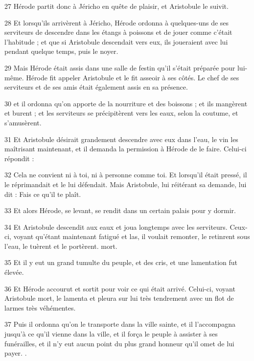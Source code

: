 \par 27 Hérode partit donc à Jéricho en quête de plaisir, et Aristobule le suivit.

\par 28 Et lorsqu'ils arrivèrent à Jéricho, Hérode ordonna à quelques-uns de ses serviteurs de descendre dans les étangs à poissons et de jouer comme c'était l'habitude ; et que si Aristobule descendait vers eux, ils joueraient avec lui pendant quelque temps, puis le noyer.

\par 29 Mais Hérode était assis dans une salle de festin qu'il s'était préparée pour lui-même. Hérode fit appeler Aristobule et le fit asseoir à ses côtés. Le chef de ses serviteurs et de ses amis était également assis en sa présence.

\par 30 et il ordonna qu'on apporte de la nourriture et des boissons ; et ils mangèrent et burent ; et les serviteurs se précipitèrent vers les eaux, selon la coutume, et s'amusèrent.

\par 31 Et Aristobule désirait grandement descendre avec eux dans l'eau, le vin les maîtrisant maintenant, et il demanda la permission à Hérode de le faire. Celui-ci répondit :

\par 32 Cela ne convient ni à toi, ni à personne comme toi. Et lorsqu'il était pressé, il le réprimandait et le lui défendait. Mais Aristobule, lui réitérant sa demande, lui dit : Fais ce qu'il te plaît.

\par 33 Et alors Hérode, se levant, se rendit dans un certain palais pour y dormir.

\par 34 Et Aristobule descendit aux eaux et joua longtemps avec les serviteurs. Ceux-ci, voyant qu'étant maintenant fatigué et las, il voulait remonter, le retinrent sous l'eau, le tuèrent et le portèrent. mort.

\par 35 Et il y eut un grand tumulte du peuple, et des cris, et une lamentation fut élevée.

\par 36 Et Hérode accourut et sortit pour voir ce qui était arrivé. Celui-ci, voyant Aristobule mort, le lamenta et pleura sur lui très tendrement avec un flot de larmes très véhémentes.

\par 37 Puis il ordonna qu'on le transporte dans la ville sainte, et il l'accompagna jusqu'à ce qu'il vienne dans la ville, et il força le peuple à assister à ses funérailles, et il n'y eut aucun point du plus grand honneur qu'il omet de lui payer. .

